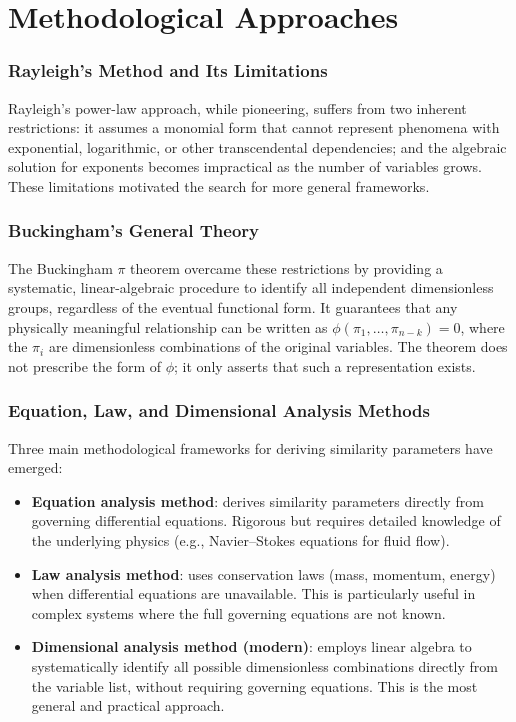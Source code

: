 \section{Methodological Approaches}\label{ch02:MethodologicalApproaches}

\subsubsection*{Rayleigh's Method and Its Limitations}

Rayleigh's power-law approach, while pioneering, suffers from two inherent restrictions: it assumes a monomial form that cannot represent phenomena with exponential, logarithmic, or other transcendental dependencies; and the algebraic solution for exponents becomes impractical as the number of variables grows. These limitations motivated the search for more general frameworks.

\subsubsection*{Buckingham's General Theory}

The Buckingham \(\pi\) theorem overcame these restrictions by providing a systematic, linear-algebraic procedure to identify all independent dimensionless groups, regardless of the eventual functional form. It guarantees that any physically meaningful relationship can be written as \(\phi(\pi_1,\ldots,\pi_{n-k})=0\), where the \(\pi_i\) are dimensionless combinations of the original variables. The theorem does not prescribe the form of \(\phi\); it only asserts that such a representation exists.

\subsubsection*{Equation, Law, and Dimensional Analysis Methods}

Three main methodological frameworks for deriving similarity parameters have emerged:

\begin{itemize}
\item \textbf{Equation analysis method}: derives similarity parameters directly from governing differential equations. Rigorous but requires detailed knowledge of the underlying physics (e.g., Navier–Stokes equations for fluid flow).
\item \textbf{Law analysis method}: uses conservation laws (mass, momentum, energy) when differential equations are unavailable. This is particularly useful in complex systems where the full governing equations are not known.
\item \textbf{Dimensional analysis method (modern)}: employs linear algebra to systematically identify all possible dimensionless combinations directly from the variable list, without requiring governing equations. This is the most general and practical approach.
\end{itemize}

